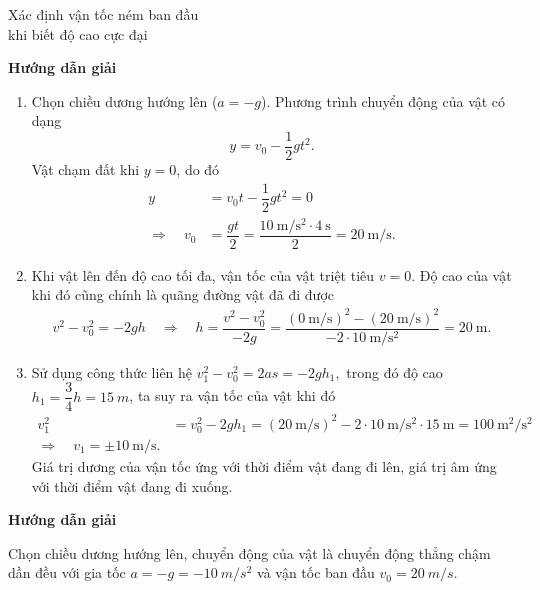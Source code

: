 \begin{dang}{Xác định vận tốc ném ban đầu \\khi biết độ cao cực đại}
	{	\begin{center}
			\textbf{Hướng dẫn giải}
		\end{center}
		\begin{enumerate}[label=\alph*.]
			\item Chọn chiều dương hướng lên ($a=-g$). Phương trình chuyển động của vật có dạng 
				$$y =v_0 - \dfrac{1}{2}gt^2.$$
			Vật chạm đất khi $y=0$, do đó 
				\begin{align*}
					y&= v_0t -\dfrac{1}{2}gt^2=0\\
					\Rightarrow\quad v_0 &=\dfrac{gt}{2}=\dfrac{
						\SI{10}{\meter/\second^2}\cdot
						\SI{4}{\second}
					}{2} =\SI{20}{\meter/\second}.
				\end{align*}
			\item Khi vật lên đến độ cao tối đa, vận tốc của vật triệt tiêu $v=0$. Độ cao của vật khi đó cũng chính là quãng đường vật đã đi được 
				\begin{align}
					v^2-v_0^2 =-2gh \quad\Rightarrow\quad h =\dfrac{v^2 -v_0^2}{-2g}=\dfrac{(\SI{0}{\meter/\second})^2-(\SI{20}{\meter/\second})^2}{-2\cdot\SI{10}{\meter/\second^{2}}}=\SI{20}{\meter}.
				\end{align}
			\item Sử dụng công thức liên hệ 
				$v_1^2-v_0^2 =2as=-2gh_1,$ 
				trong đó độ cao $h_1=\dfrac{3}{4}h=\SI{15}{m}$,
				ta suy ra vận tốc của vật khi đó 
					\begin{align*}
						v_1^2&=v_0^2 -2gh_1=(\SI{20}{\meter/\second})^2-2\cdot\SI{10}{\meter/\second^{2}}\cdot\SI{15}{\meter}=\SI{100}{\meter^2/\second^2}\\
						\Rightarrow\quad v_1=\pm \SI{10}{\meter/\second}.
					\end{align*}
				Giá trị dương của vận tốc ứng với thời điểm vật đang đi lên, giá trị âm ứng với thời điểm vật đang đi xuống. 
		\end{enumerate}
	}
	{	\begin{center}
			\textbf{Hướng dẫn giải}
		\end{center}
		Chọn chiều dương hướng lên, chuyển động của vật là chuyển động thẳng chậm dần đều với gia tốc $a = -g = -\SI{10}{m/s^2}$ và vận tốc ban đầu $v_0=\SI{20}{m/s}.$
		
}
\end{dang}
